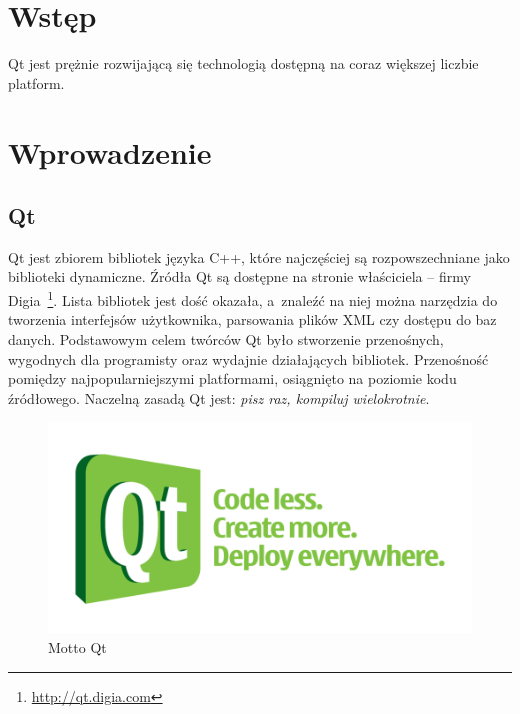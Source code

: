 \chapter*{Wstęp}
Qt jest prężnie rozwijającą się technologią dostępną na coraz większej liczbie platform.


\chapter{Wprowadzenie}
\section{Qt}
Qt jest zbiorem bibliotek języka C++, które najczęściej są rozpowszechniane jako biblioteki dynamiczne. Źródła Qt są dostępne na stronie właściciela -- firmy Digia~\footnote{\url{http://qt.digia.com}}. Lista bibliotek jest dość okazała, a~znaleźć na niej można narzędzia do tworzenia interfejsów użytkownika, parsowania plików XML czy dostępu do baz danych. Podstawowym celem twórców Qt było stworzenie przenośnych, wygodnych dla programisty oraz wydajnie działających bibliotek. Przenośność pomiędzy najpopularniejszymi platformami, osiągnięto na poziomie kodu źródłowego. Naczelną zasadą Qt jest: \textit{pisz raz, kompiluj wielokrotnie}. 

\begin{figure}
\centering
\includegraphics[scale=0.7]{img/qt-rule.png}
\caption{Motto Qt}
\end{figure}

